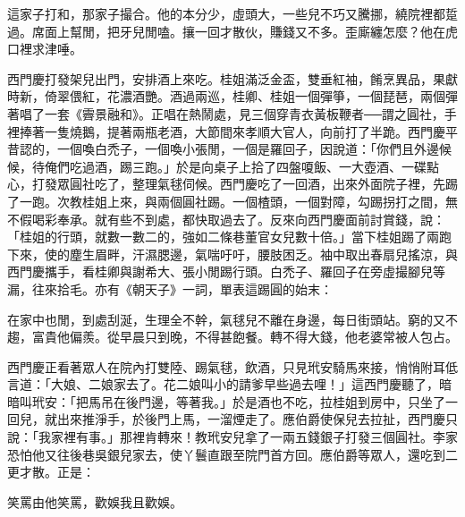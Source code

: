 這家子打和，那家子撮合。他的本分少，虛頭大，一些兒不巧又騰挪，繞院裡都踅過。席面上幫閒，把牙兒閒嗑。攘一回才散伙，賺錢又不多。歪廝纏怎麼？他在虎口裡求津唾。

西門慶打發架兒出門，安排酒上來吃。桂姐滿泛金盃，雙垂紅袖，餚烹異品，果獻時新，倚翠偎紅，花濃酒艷。酒過兩巡，桂卿、桂姐一個彈箏，一個琵琶，兩個彈著唱了一套《霽景融和》。正唱在熱鬧處，見三個穿青衣黃板鞭者──謂之圓社，手裡捧著一隻燒鵝，提著兩瓶老酒，大節間來孝順大官人，向前打了半跪。西門慶平昔認的，一個喚白禿子，一個喚小張閒，一個是羅回子，因說道：「你們且外邊候候，待俺們吃過酒，踢三跑。」於是向桌子上拾了四盤嗄飯、一大壺酒、一碟點心，打發眾圓社吃了，整理氣毬伺候。西門慶吃了一回酒，出來外面院子裡，先踢了一跑。次教桂姐上來，與兩個圓社踢。一個楂頭，一個對障，勾踢拐打之間，無不假喝彩奉承。就有些不到處，都快取過去了。反來向西門慶面前討賞錢，說：「桂姐的行頭，就數一數二的，強如二條巷董官女兒數十倍。」當下桂姐踢了兩跑下來，使的塵生眉畔，汗濕腮邊，氣喘吁吁，腰肢困乏。袖中取出春扇兒搖涼，與西門慶攜手，看桂卿與謝希大、張小閒踢行頭。白禿子、羅回子在旁虛撮腳兒等漏，往來拾毛。亦有《朝天子》一詞，單表這踢圓的始末：

在家中也閒，到處刮涎，生理全不幹，氣毬兒不離在身邊，每日街頭站。窮的又不趨，富貴他偏羨。從早晨只到晚，不得甚飽餐。轉不得大錢，他老婆常被人包占。

西門慶正看著眾人在院內打雙陸、踢氣毬，飲酒，只見玳安騎馬來接，悄悄附耳低言道：「大娘、二娘家去了。花二娘叫小的請爹早些過去哩！」這西門慶聽了，暗暗叫玳安：「把馬吊在後門邊，等著我。」於是酒也不吃，拉桂姐到房中，只坐了一回兒，就出來推淨手，於後門上馬，一溜煙走了。應伯爵使保兒去拉扯，西門慶只說：「我家裡有事。」那裡肯轉來！教玳安兒拿了一兩五錢銀子打發三個圓社。李家恐怕他又往後巷吳銀兒家去，使丫鬟直跟至院門首方回。應伯爵等眾人，還吃到二更才散。正是：

笑罵由他笑罵，歡娛我且歡娛。

